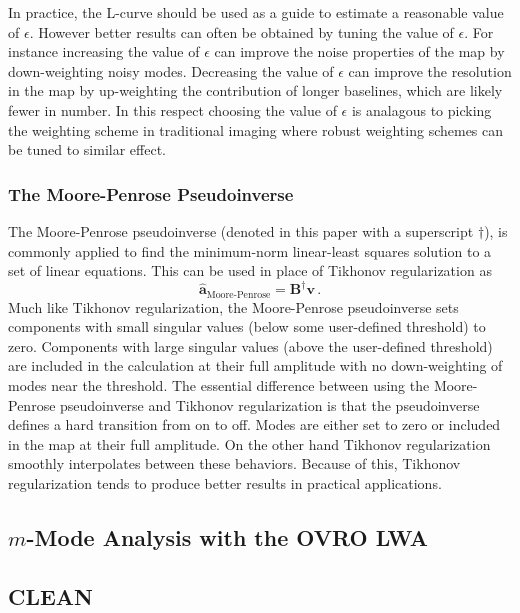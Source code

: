 \documentclass[twocolumn]{aastex6}
\renewcommand{\b}{\pmb}
\begin{document}
In practice, the L-curve should be used as a guide to estimate a reasonable value of $\epsilon$.
However better results can often be obtained by tuning the value of $\epsilon$. For instance
increasing the value of $\epsilon$ can improve the noise properties of the map by down-weighting
noisy modes. Decreasing the value of $\epsilon$ can improve the resolution in the map by
up-weighting the contribution of longer baselines, which are likely fewer in number. In this respect
choosing the value of $\epsilon$ is analagous to picking the weighting scheme in traditional
imaging where robust weighting schemes can be tuned to similar effect.

\subsubsection{The Moore-Penrose Pseudoinverse}

The Moore-Penrose pseudoinverse (denoted in this paper with a superscript $\dagger$), is commonly
applied to find the minimum-norm linear-least squares solution to a set of linear equations. This
can be used in place of Tikhonov regularization as
\begin{equation}
    \b{\hat a}_\text{Moore-Penrose} = \b B^\dagger\b v\,.
\end{equation}
Much like Tikhonov regularization, the Moore-Penrose pseudoinverse sets components with small
singular values (below some user-defined threshold) to zero. Components with large singular values
(above the user-defined threshold) are included in the calculation at their full amplitude with no
down-weighting of modes near the threshold. The essential difference between using the Moore-Penrose
pseudoinverse and Tikhonov regularization is that the pseudoinverse defines a hard transition from
on to off. Modes are either set to zero or included in the map at their full amplitude. On the other
hand Tikhonov regularization smoothly interpolates between these behaviors. Because of this,
Tikhonov regularization tends to produce better results in practical applications.

\subsection{$m$-Mode Analysis with the OVRO LWA}






\subsection{CLEAN}
\end{document}

